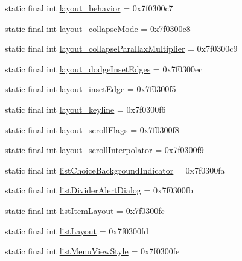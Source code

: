 \begin{DoxyCompactItemize}
\item 
static final int \mbox{\hyperlink{classandroid_1_1support_1_1design_1_1R_1_1attr_aa690424f72fdba65a975e5e812780c53}{layout\+\_\+behavior}} = 0x7f0300c7
\item 
static final int \mbox{\hyperlink{classandroid_1_1support_1_1design_1_1R_1_1attr_a73918d086000ebb3ad8010659a217a0d}{layout\+\_\+collapse\+Mode}} = 0x7f0300c8
\item 
static final int \mbox{\hyperlink{classandroid_1_1support_1_1design_1_1R_1_1attr_ab2173014ba4a8ee69f0e09827602f535}{layout\+\_\+collapse\+Parallax\+Multiplier}} = 0x7f0300c9
\item 
static final int \mbox{\hyperlink{classandroid_1_1support_1_1design_1_1R_1_1attr_a0da4c563fe3062f6f8b731a31e469f08}{layout\+\_\+dodge\+Inset\+Edges}} = 0x7f0300ec
\item 
static final int \mbox{\hyperlink{classandroid_1_1support_1_1design_1_1R_1_1attr_a66add14821aecea89fa64da89bb33e2c}{layout\+\_\+inset\+Edge}} = 0x7f0300f5
\item 
static final int \mbox{\hyperlink{classandroid_1_1support_1_1design_1_1R_1_1attr_ae22d5ebf8c270969d1d114b91f10a685}{layout\+\_\+keyline}} = 0x7f0300f6
\item 
static final int \mbox{\hyperlink{classandroid_1_1support_1_1design_1_1R_1_1attr_abf06a4d322c60012a8612e711555e8c3}{layout\+\_\+scroll\+Flags}} = 0x7f0300f8
\item 
static final int \mbox{\hyperlink{classandroid_1_1support_1_1design_1_1R_1_1attr_a85a03bcc3fcfea96ee5bb83a61c79132}{layout\+\_\+scroll\+Interpolator}} = 0x7f0300f9
\item 
static final int \mbox{\hyperlink{classandroid_1_1support_1_1design_1_1R_1_1attr_a303695f1026550d65c52a23561edb55c}{list\+Choice\+Background\+Indicator}} = 0x7f0300fa
\item 
static final int \mbox{\hyperlink{classandroid_1_1support_1_1design_1_1R_1_1attr_a7218bfb0fa2e50c3a1ce684d85659d65}{list\+Divider\+Alert\+Dialog}} = 0x7f0300fb
\item 
static final int \mbox{\hyperlink{classandroid_1_1support_1_1design_1_1R_1_1attr_a9a81a0eeb365ab02776b4193e8c9841e}{list\+Item\+Layout}} = 0x7f0300fc
\item 
static final int \mbox{\hyperlink{classandroid_1_1support_1_1design_1_1R_1_1attr_ad95a0616f4a1878b1272b321ae0d6643}{list\+Layout}} = 0x7f0300fd
\item 
static final int \mbox{\hyperlink{classandroid_1_1support_1_1design_1_1R_1_1attr_a834806ce5817ca88a132020fd2daf773}{list\+Menu\+View\+Style}} = 0x7f0300fe

\end{DoxyCompactItemize}
